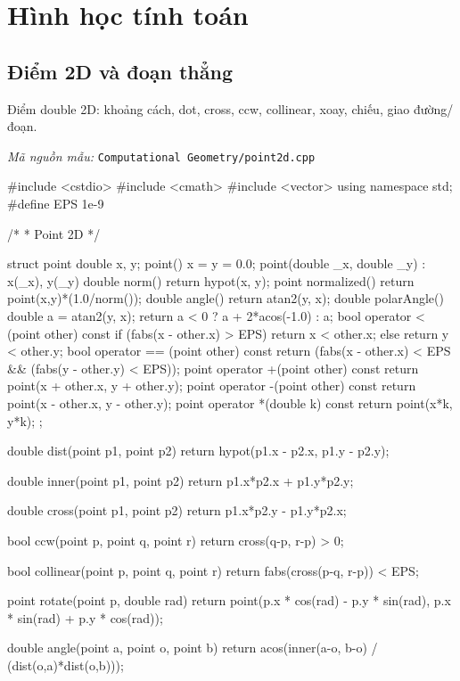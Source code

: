 \documentclass[11pt]{article}
\newcommand{\codepath}[1]{\par\noindent\textit{Mã nguồn mẫu:} \texttt{#1}\par}
\begin{document}
\clearpage

\section{Hình học tính toán}

\subsection{Điểm 2D và đoạn thẳng}

Điểm double 2D: khoảng cách, dot, cross, ccw, collinear, xoay, chiếu, giao đường/đoạn.

\codepath{Computational Geometry/point2d.cpp}

\begingroup\scriptsize
\begin{vncode}
#include <cstdio>
#include <cmath>
#include <vector>
using namespace std;
#define EPS 1e-9

/*
 * Point 2D
 */

struct point {
	double x, y;
	point() { x = y = 0.0; }
	point(double _x, double _y) : x(_x), y(_y) {}
	double norm() {
		return hypot(x, y);
	}
	point normalized() {
		return point(x,y)*(1.0/norm());
	}
	double angle() { return atan2(y, x); }
	double polarAngle() {
		double a = atan2(y, x);
		return a < 0 ? a + 2*acos(-1.0) : a;
	}
	bool operator < (point other) const {
		if (fabs(x - other.x) > EPS) return x < other.x;
		else return y < other.y;
	}
	bool operator == (point other) const {
		return (fabs(x - other.x) < EPS && (fabs(y - other.y) < EPS));
	}
	point operator +(point other) const {
		return point(x + other.x, y + other.y);
	}
	point operator -(point other) const {
		return point(x - other.x, y - other.y);
	}
	point operator *(double k) const {
		return point(x*k, y*k);
	}
};

double dist(point p1, point p2) {
	return hypot(p1.x - p2.x, p1.y - p2.y);
}

double inner(point p1, point p2) {
	return p1.x*p2.x + p1.y*p2.y;
}

double cross(point p1, point p2) {
	return p1.x*p2.y - p1.y*p2.x;
}

bool ccw(point p, point q, point r) {
	return cross(q-p, r-p) > 0;
}

bool collinear(point p, point q, point r) {
	return fabs(cross(p-q, r-p)) < EPS;
}

point rotate(point p, double rad) {
	return point(p.x * cos(rad) - p.y * sin(rad),
	p.x * sin(rad) + p.y * cos(rad));
}

double angle(point a, point o, point b) {
	return acos(inner(a-o, b-o) / (dist(o,a)*dist(o,b)));
}


\end{vncode}
\end{document}
